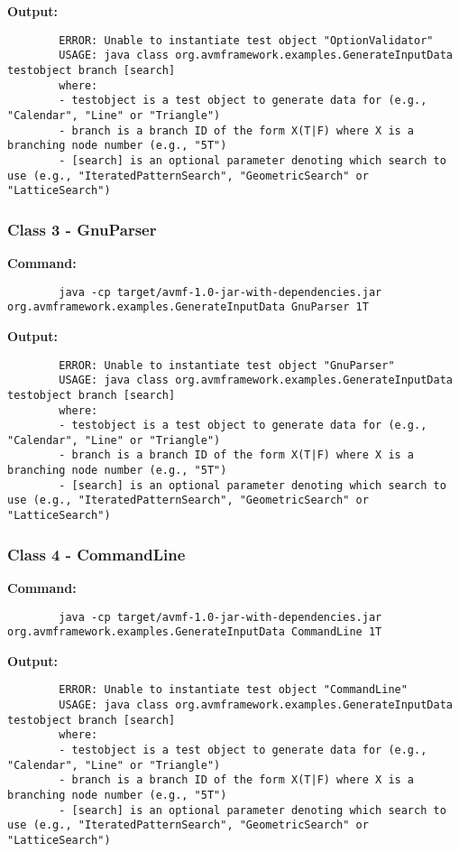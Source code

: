 \documentclass[letterpaper,10pt]{article}
\begin{document}
		\textbf{Output: }
		\begin{lstlisting}
		ERROR: Unable to instantiate test object "OptionValidator"
		USAGE: java class org.avmframework.examples.GenerateInputData testobject branch [search] 
		where: 
		- testobject is a test object to generate data for (e.g., "Calendar", "Line" or "Triangle")
		- branch is a branch ID of the form X(T|F) where X is a branching node number (e.g., "5T")
		- [search] is an optional parameter denoting which search to use (e.g., "IteratedPatternSearch", "GeometricSearch" or "LatticeSearch")
		\end{lstlisting}

		\subsubsection{Class 3 - GnuParser}
		\textbf{Command: }
		\begin{lstlisting}
		java -cp target/avmf-1.0-jar-with-dependencies.jar org.avmframework.examples.GenerateInputData GnuParser 1T
		\end{lstlisting}

		\textbf{Output: }
		\begin{lstlisting}
		ERROR: Unable to instantiate test object "GnuParser"
		USAGE: java class org.avmframework.examples.GenerateInputData testobject branch [search] 
		where: 
		- testobject is a test object to generate data for (e.g., "Calendar", "Line" or "Triangle")
		- branch is a branch ID of the form X(T|F) where X is a branching node number (e.g., "5T")
		- [search] is an optional parameter denoting which search to use (e.g., "IteratedPatternSearch", "GeometricSearch" or "LatticeSearch")
		\end{lstlisting}

		\subsubsection{Class 4 - CommandLine}
		\textbf{Command: }
		\begin{lstlisting}
		java -cp target/avmf-1.0-jar-with-dependencies.jar org.avmframework.examples.GenerateInputData CommandLine 1T
		\end{lstlisting}

		\textbf{Output: }
		\begin{lstlisting}
		ERROR: Unable to instantiate test object "CommandLine"
		USAGE: java class org.avmframework.examples.GenerateInputData testobject branch [search] 
		where: 
		- testobject is a test object to generate data for (e.g., "Calendar", "Line" or "Triangle")
		- branch is a branch ID of the form X(T|F) where X is a branching node number (e.g., "5T")
		- [search] is an optional parameter denoting which search to use (e.g., "IteratedPatternSearch", "GeometricSearch" or "LatticeSearch")
		\end{lstlisting}
\end{document}
